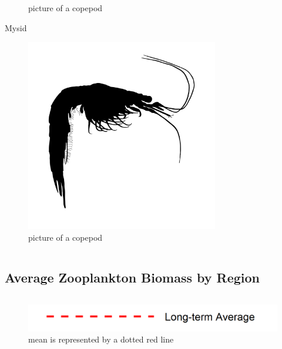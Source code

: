 \documentclass[
]{book}
\begin{document}
\begin{columns-nocenter}
\begin{column}
\begin{figure}
{}

\caption{picture of a copepod}\label{fig:unnamed-chunk-24}
\end{figure}

Mysid

\begin{figure}

{\centering \includegraphics[width=3.31in]{figures/mysid} 

}

\caption{picture of a copepod}\label{fig:unnamed-chunk-25}
\end{figure}

\end{column}

\end{columns-nocenter}

\hypertarget{average-zooplankton-biomass-by-region}{%
\subsection{Average Zooplankton Biomass by Region}\label{average-zooplankton-biomass-by-region}}

\begin{columns-nocenter}

\begin{column}

\begin{figure}
\includegraphics[width=15.25in]{figures/mline} \caption{mean is represented by a dotted red line}\label{fig:unnamed-chunk-26}
\end{figure}

\end{column}

\begin{column}

\end{column}

\begin{column}

\end{column}

\end{columns-nocenter}
\end{document}
